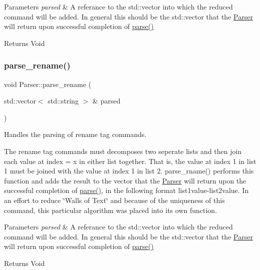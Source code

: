 \begin{DoxyParams}{Parameters}
{\em parsed} & A referance to the std\+::vector into which the reduced command will be added. In general this should be the std\+::vector that the \mbox{\hyperlink{class_parser}{Parser}} will return upon successful completion of \mbox{\hyperlink{class_parser_a5b531e9ed867eeb8ccb9cb088cf35c24}{parse()}}\\
\hline
\end{DoxyParams}
\begin{DoxyReturn}{Returns}
Void 
\end{DoxyReturn}
\mbox{\label{class_parser_a6e7db54feacd1bff189de70135cd3216}} 
\subsubsection{\texorpdfstring{parse\+\_\+rename()}{parse\_rename()}}
{\footnotesize\ttfamily void Parser\+::parse\+\_\+rename (\begin{DoxyParamCaption}\item[{std\+::vector$<$ std\+::string $>$ \&}]{parsed }\end{DoxyParamCaption})\hspace{0.3cm}{\ttfamily [private]}}



Handles the parsing of \textquotesingle{}rename tag\textquotesingle{} commands. 

The \textquotesingle{}rename tag\textquotesingle{} commands must decomposes two seperate lists and then join each value at index = x in either list together. That is, the value at index 1 in list 1 must be joined with the value at index 1 in list 2. parse\+\_\+rname() performs this function and adds the result to the vector that the \mbox{\hyperlink{class_parser}{Parser}} will return upon the successful completion of \mbox{\hyperlink{class_parser_a5b531e9ed867eeb8ccb9cb088cf35c24}{parse()}}, in the following format \textquotesingle{}list1value-\/list2value\textquotesingle{}. In an effort to reduce \char`\"{}\+Walls of Text\char`\"{} and because of the uniqueness of this command, this particular algorithm was placed into its own function.


\begin{DoxyParams}{Parameters}
{\em parsed} & A referance to the std\+::vector into which the reduced command will be added. In general this should be the std\+::vector that the \mbox{\hyperlink{class_parser}{Parser}} will return upon successful completion of \mbox{\hyperlink{class_parser_a5b531e9ed867eeb8ccb9cb088cf35c24}{parse()}}\\
\hline
\end{DoxyParams}
\begin{DoxyReturn}{Returns}
Void 
\end{DoxyReturn}
\mbox{\label{class_parser_a87f5e73ca10ef5f84f37a4b37e0e6f59}} 
